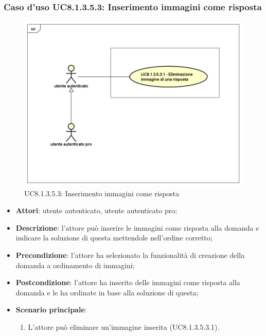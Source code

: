 \subsubsection{Caso d'uso UC8.1.3.5.3: Inserimento immagini come risposta}
\label{UC8.1.3.5.3}
\begin{figure}[h]
	\centering
	\includegraphics[scale=0.45,keepaspectratio]{UML/UC8_1_3_5_3.png}
	\caption{UC8.1.3.5.3: Inserimento immagini come risposta}
\end{figure}
\begin{itemize}
	\item\textbf{Attori}: utente autenticato, utente autenticato pro;
	\item\textbf{Descrizione}: l'attore può inserire le immagini come risposta alla domanda e indicare la soluzione di questa mettendole nell'ordine corretto;
	\item\textbf{Precondizione}: l'attore ha selezionato la funzionalità di creazione della domanda a ordinamento di immagini; 
	\item \textbf{Postcondizione}: l'attore ha inserito delle immagini come risposta alla domanda e le ha ordinate in base alla soluzione di questa;
	\item\textbf{Scenario principale}:
		\begin{enumerate}
			\item L'attore può eliminare un'immagine inserita (UC8.1.3.5.3.1).
		\end{enumerate}
\end{itemize}
